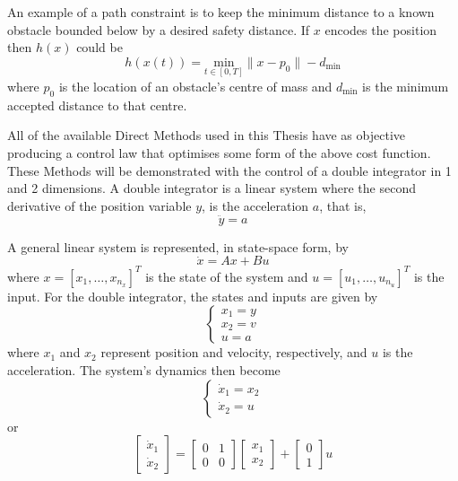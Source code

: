 \par An example of a path constraint is to keep the minimum distance to a known obstacle bounded below by a desired safety distance. If $x$ encodes the position then $h(x)$ could be
\begin{equation}
    \label{eq:example_constr}
    h(x(t)) = \underset{t\in[0,T]}{\text{min}}\lVert x - p_0 \rVert - d_{\text{min}}
\end{equation}
where $p_0$ is the location of an obstacle's centre of mass and $d_{\text{min}}$ is the minimum accepted distance to that centre.

\par All of the available Direct Methods used in this Thesis have as objective producing a control law that optimises some form of the above cost function. These Methods will be demonstrated with the control of a double integrator in 1 and 2 dimensions. A double integrator is a linear system where the second derivative of the position variable $y$, is the acceleration $a$, that is,
\begin{equation}
    \ddot{y} = a
    \label{eq:basic_double_int}
\end{equation}
\par A general linear system is represented, in state-space form, by
\begin{equation}
    \dot{x} = Ax + Bu
    \label{eq:general_state_space}
\end{equation}
where $x = [x_1,\dots,x_{n_x}]^T$ is the state of the system and $u = [u_1,\dots,u_{n_u}]^T$ is the input. For the double integrator, the states and inputs are given by
\begin{equation}
\begin{cases}
    x_1 = y \\ x_2 = v \\ u = a
\end{cases}
\end{equation}
where $x_1$ and $x_2$ represent position and velocity, respectively, and $u$ is the acceleration. The system's dynamics then become
\begin{equation}
    \label{eq:dynamics_double_int}
    \begin{cases}
        \dot{x}_1 = x_2 \\
        \dot{x}_2 = u
    \end{cases}
\end{equation}
or
\begin{equation}
    \begin{bmatrix}
    \dot{x}_1 \\ \dot{x}_2
    \end{bmatrix} = 
    \begin{bmatrix} 0 & 1 \\ 0 & 0 \end{bmatrix} 
    \begin{bmatrix} x_1 \\ x_2 \end{bmatrix} + 
    \begin{bmatrix} 0 \\ 1 \end{bmatrix} u
    \label{eq:state_space_double_int}
\end{equation}
